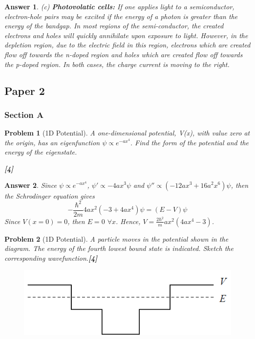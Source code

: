 \documentclass[a4paper]{article}
\newtheorem{ans}{Answer}[subsection]
\theoremstyle{new}
\newtheorem{qns}{Problem}[subsection]
\begin{document}
\begin{ans}
(c) \textbf{Photovolatic cells:} If one applies light to a semiconductor, electron-hole pairs may be excited if the energy of a photon is greater than the energy of the bandgap. In most regions of the semi-conductor, the created electrons and holes will quickly annihilate upon exposure to light. However, in the depletion region, due to the electric field in this region, electrons which are created flow off towards the n-doped region and holes which are created flow off towards the p-doped region. In both cases, the charge current is moving to the right.
\end{ans}
\newpage
\subsection{Paper 2}
\subsubsection{Section A}
\begin{qns}[1D Potential]
A one-dimensional potential, V(x), with value zero at the origin, has an eigenfunction $\psi\propto e^{-ax^4}$. Find the form of the potential and the energy of the eigenstate. 

\hfill\textbf{[4]}
\end{qns}
\begin{ans}
Since $\psi\propto e^{-ax^4}$, $\psi'\propto -4ax^3\psi$ and $\psi''\propto (-12ax^3+16a^2x^6)\psi$, then the Schrodinger equation gives
$$-\frac{\hbar^2}{2m}4ax^2(-3+4ax^4)\psi=(E-V)\psi$$
Since $V(x=0)=0$, then $E=0$ $\forall x$. Hence, $V=\frac{2\hbar^2}{m}ax^2(4ax^4-3)$.
\end{ans}
\begin{qns}[1D Potential]
A particle moves in the potential shown in the diagram. The energy of the fourth lowest bound state is indicated. Sketch the corresponding wavefunction.\hfill\textbf{[4]}
\begin{figure}[H]
    \centering
    \includegraphics[scale=0.5]{2011P2A2Q.PNG}
\end{figure}
\end{qns}
\end{document}
